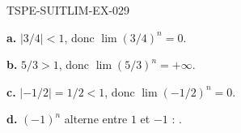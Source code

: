 \begin{corrige}{TSPE-SUITLIM-EX-029}

\textbf{a.} $|3/4|<1$, donc $\lim (3/4)^n = \boxed{0}$.

\textbf{b.} $5/3>1$, donc $\lim (5/3)^n = \boxed{+\infty}$.

\textbf{c.} $|-1/2|=1/2<1$, donc $\lim (-1/2)^n = \boxed{0}$.

\textbf{d.} $(-1)^n$ alterne entre $1$ et $-1$ : .

\end{corrige}
